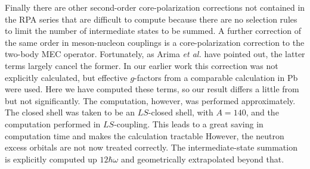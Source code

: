 \documentclass[aps,twocolumn,superscriptaddress,prc,showpacs]{revtex4}
\begin{document}
Finally there are other second-order core-polarization corrections not
contained in the RPA series that are difficult to compute because there
are
no selection rules to limit the number of intermediate states to be
summed.  A further correction of the same order in meson-nucleon
couplings
is a core-polarization correction to the two-body MEC operator.
Fortunately, as Arima {\it et al.} \cite{AH79,HAS80} have
pointed out,
the latter terms largely cancel the former.
In our earlier work \cite{St97}
this correction was not explicitly calculated, but effective $  g
$-factors
from a comparable calculation in Pb were used.  Here we have computed
these terms, so our result differs a little from \cite{St97} but not
significantly.  The computation, however, was performed approximately.
The closed shell was taken to be an $LS$-closed shell, with $A=140$,   
and the computation performed in $LS$-coupling.  This leads to a great   
saving in computation time and makes the calculation tractable
However, the neutron excess orbitals are not now treated correctly.
The intermediate-state summation is explicitly computed up
$  12 \hbar \omega  $ and geometrically extrapolated beyond that.
\end{document}
